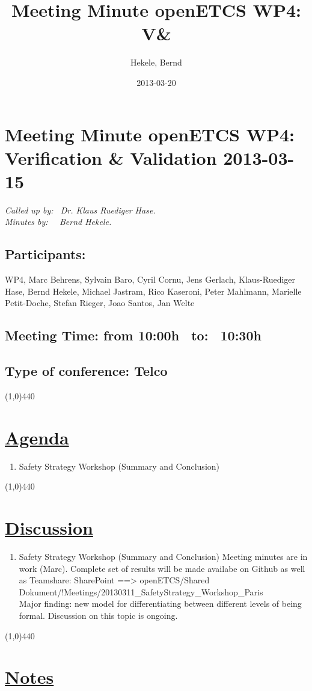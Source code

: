 \documentclass[a4paper]{article}
\title{Meeting Minute openETCS WP4: V&\V}
\author{Hekele, Bernd}
\date{2013-03-20}
\begin{document}
\section*{\large{Meeting Minute openETCS WP4: Verification \& Validation 2013-03-15}}

\emph{Called up by: \ Dr. Klaus Ruediger Hase.}\\
\emph{Minutes by: \ \  Bernd Hekele.}


\subsection*{Participants:} WP4, 
Marc Behrens, 
Sylvain Baro,
Cyril Cornu, 
Jens Gerlach, 
Klaus-Ruediger Hase, 
Bernd Hekele,
Michael Jastram, 
Rico Kaseroni, 
Peter Mahlmann, 
Marielle Petit-Doche, 
Stefan Rieger,
Joao Santos, 
Jan Welte\\


\subsection*{Meeting Time: from 10:00h \ to: \ 10:30h}

\subsection*{Type of conference: Telco}

\line(1,0){440}
\section*{\underline{Agenda}}
\begin{enumerate}
\item Safety Strategy Workshop (Summary and Conclusion)
\end{enumerate}
\line(1,0){440}
\section*{\underline{Discussion}}

\begin{enumerate}

\item Safety Strategy Workshop (Summary and Conclusion)\newline
Meeting minutes are in work (Marc). Complete set of results will be made availabe on Github as well as Teamshare:\newline
SharePoint ==> openETCS/Shared Dokument/!Meetings/20130311\_SafetyStrategy\_Workshop\_Paris\\
Major finding: new model for differentiating between different levels of being formal. Discussion on this topic is ongoing.\\


\end{enumerate}

\line(1,0){440}
\section*{\underline{Notes}}
\end{document}
